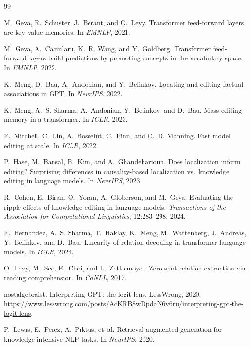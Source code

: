 \documentclass[11pt]{article}
\begin{document}

\begin{thebibliography}{99}

M.~Geva, R.~Schuster, J.~Berant, and O.~Levy.
\newblock Transformer feed-forward layers are key-value memories.
\newblock In \emph{EMNLP}, 2021.

M.~Geva, A.~Caciularu, K.~R. Wang, and Y.~Goldberg.
\newblock Transformer feed-forward layers build predictions by promoting concepts in the vocabulary space.
\newblock In \emph{EMNLP}, 2022.

K.~Meng, D.~Bau, A.~Andonian, and Y.~Belinkov.
\newblock Locating and editing factual associations in GPT.
\newblock In \emph{NeurIPS}, 2022.

K.~Meng, A.~S. Sharma, A.~Andonian, Y.~Belinkov, and D.~Bau.
\newblock Mass-editing memory in a transformer.
\newblock In \emph{ICLR}, 2023.

E.~Mitchell, C.~Lin, A.~Bosselut, C.~Finn, and C.~D. Manning.
\newblock Fast model editing at scale.
\newblock In \emph{ICLR}, 2022.

P.~Hase, M.~Bansal, B.~Kim, and A.~Ghandeharioun.
\newblock Does localization inform editing? Surprising differences in causality-based localization vs.\ knowledge editing in language models.
\newblock In \emph{NeurIPS}, 2023.

R.~Cohen, E.~Biran, O.~Yoran, A.~Globerson, and M.~Geva.
\newblock Evaluating the ripple effects of knowledge editing in language models.
\newblock \emph{Transactions of the Association for Computational Linguistics}, 12:283--298, 2024.

E.~Hernandez, A.~S. Sharma, T.~Haklay, K.~Meng, M.~Wattenberg, J.~Andreas, Y.~Belinkov, and D.~Bau.
\newblock Linearity of relation decoding in transformer language models.
\newblock In \emph{ICLR}, 2024.

O.~Levy, M.~Seo, E.~Choi, and L.~Zettlemoyer.
\newblock Zero-shot relation extraction via reading comprehension.
\newblock In \emph{CoNLL}, 2017.

nostalgebraist.
\newblock Interpreting GPT: the logit lens.
\newblock LessWrong, 2020.
\newblock \url{https://www.lesswrong.com/posts/AcKRB8wDpdaN6v6ru/interpreting-gpt-the-logit-lens}.

P.~Lewis, E.~Perez, A.~Piktus, et~al.
\newblock Retrieval-augmented generation for knowledge-intensive NLP tasks.
\newblock In \emph{NeurIPS}, 2020.


\end{thebibliography}
\end{document}
